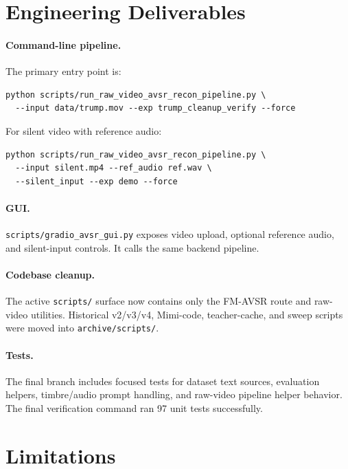 \documentclass{article}
\begin{document}
\section{Engineering Deliverables}

\paragraph{Command-line pipeline.} The primary entry point is:
\begin{verbatim}
python scripts/run_raw_video_avsr_recon_pipeline.py \
  --input data/trump.mov --exp trump_cleanup_verify --force
\end{verbatim}
For silent video with reference audio:
\begin{verbatim}
python scripts/run_raw_video_avsr_recon_pipeline.py \
  --input silent.mp4 --ref_audio ref.wav \
  --silent_input --exp demo --force
\end{verbatim}

\paragraph{GUI.} \texttt{scripts/gradio\_avsr\_gui.py} exposes video upload,
optional reference audio, and silent-input controls. It calls the same backend
pipeline.

\paragraph{Codebase cleanup.} The active \texttt{scripts/} surface now contains
only the FM-AVSR route and raw-video utilities. Historical v2/v3/v4,
Mimi-code, teacher-cache, and sweep scripts were moved into
\texttt{archive/scripts/}.

\paragraph{Tests.} The final branch includes focused tests for dataset text
sources, evaluation helpers, timbre/audio prompt handling, and raw-video
pipeline helper behavior. The final verification command ran 97 unit tests
successfully.

\section{Limitations}
\end{document}

